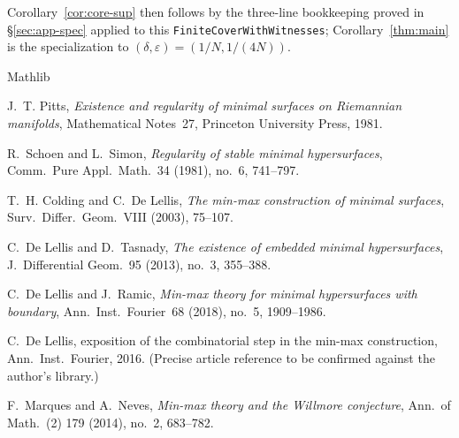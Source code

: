 \documentclass[11pt,reqno]{amsart}
\theoremstyle{definition}
\begin{document}
Corollary~\ref{cor:core-sup} then follows by the three-line
bookkeeping proved in \S\ref{sec:app-spec} applied to this
\texttt{FiniteCoverWithWitnesses}; Corollary~\ref{thm:main} is
the specialization to $(\delta, \varepsilon) = (1/N, 1/(4N))$.

\begin{thebibliography}{Mathlib}

J.~T. Pitts, \emph{Existence and regularity of minimal surfaces
on Riemannian manifolds}, Mathematical Notes~27, Princeton
University Press, 1981.

R.~Schoen and L.~Simon, \emph{Regularity of stable minimal
hypersurfaces}, Comm.\ Pure Appl.\ Math.~34 (1981), no.~6,
741--797.

T.~H. Colding and C.~De Lellis, \emph{The min-max construction
of minimal surfaces}, Surv.\ Differ.\ Geom.~VIII (2003),
75--107.

C.~De Lellis and D.~Tasnady, \emph{The existence of embedded
minimal hypersurfaces}, J.\ Differential Geom.~95 (2013),
no.~3, 355--388.

C.~De Lellis and J.~Ramic, \emph{Min-max theory for minimal
hypersurfaces with boundary}, Ann.\ Inst.\ Fourier~68 (2018),
no.~5, 1909--1986.

C.~De Lellis, exposition of the combinatorial step in the min-max
construction, Ann.\ Inst.\ Fourier, 2016. (Precise article
reference to be confirmed against the author's library.)

F.~Marques and A.~Neves, \emph{Min-max theory and the Willmore
conjecture}, Ann.\ of Math.~(2) 179 (2014), no.~2, 683--782.

\end{thebibliography}
\end{document}
